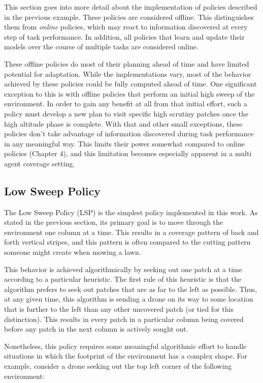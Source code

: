 This section goes into more detail about the implementation of policies described in the previous example. These policies are considered offline. This distinguishes them from \textit{online} policies, which may react to information discovered at every step of task performance. In addition, all policies that learn and update their models over the course of multiple tasks are considered online.

These offline policies do most of their planning ahead of time and have limited potential for adaptation. While the implementations vary, most of the behavior achieved by these policies could be fully computed ahead of time. One significant exception to this is with offline policies that perform an initial high sweep of the environment. In order to gain any benefit at all from that initial effort, such a policy must develop a new plan to visit specific high scrutiny patches once the high altitude phase is complete. With that and other small exceptions, these policies don't take advantage of information discovered during task performance in any meaningful way. This limits their power somewhat compared to online policies (Chapter 4), and this limitation becomes especially apparent in a multi agent coverage setting.

\subsection{Low Sweep Policy}

The Low Sweep Policy (LSP) is the simplest policy implemented in this work. As stated in the previous section, its primary goal is to move through the environment one column at a time. This results in a coverage pattern of back and forth vertical stripes, and this pattern is often compared to the cutting pattern someone might create when mowing a lawn. 

This behavior is achieved algorithmically by seeking out one patch at a time according to a particular heuristic. The first rule of this heuristic is that the algorithm prefers to seek out patches that are as far to the left as possible. Thus, at any given time, this algorithm is sending a drone on its way to some location that is further to the left than any other uncovered patch (or tied for this distinction). This results in every patch in a particular column being covered before any patch in the next column is actively sought out.

Nonetheless, this policy requires some meaningful algorithmic effort to handle situations in which the footprint of the environment has a complex shape. For example, consider a drone seeking out the top left corner of the following environment:

